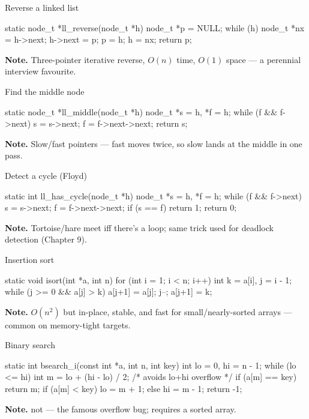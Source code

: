 \begin{gymproblem}{Reverse a linked list}
\begin{cgym}
static node_t *ll_reverse(node_t *h) {
    node_t *p = NULL;
    while (h) { node_t *nx = h->next; h->next = p; p = h; h = nx; }
    return p;
}
\end{cgym}
\textbf{Note.} Three-pointer iterative reverse, $O(n)$ time, $O(1)$ space ---
a perennial interview favourite.
\end{gymproblem}

\begin{gymproblem}{Find the middle node}
\begin{cgym}
static node_t *ll_middle(node_t *h) {
    node_t *s = h, *f = h;
    while (f && f->next) { s = s->next; f = f->next->next; }
    return s;
}
\end{cgym}
\textbf{Note.} Slow/fast pointers --- fast moves twice, so slow lands at the
middle in one pass.
\end{gymproblem}

\begin{gymproblem}{Detect a cycle (Floyd)}
\begin{cgym}
static int ll_has_cycle(node_t *h) {
    node_t *s = h, *f = h;
    while (f && f->next) { s = s->next; f = f->next->next; if (s == f) return 1; }
    return 0;
}
\end{cgym}
\textbf{Note.} Tortoise/hare meet iff there's a loop; same trick used for
deadlock detection (Chapter 9).
\end{gymproblem}

\begin{gymproblem}{Insertion sort}
\begin{cgym}
static void isort(int *a, int n) {
    for (int i = 1; i < n; i++) {
        int k = a[i], j = i - 1;
        while (j >= 0 && a[j] > k) { a[j+1] = a[j]; j--; }
        a[j+1] = k;
    }
}
\end{cgym}
\textbf{Note.} $O(n^2)$ but in-place, stable, and fast for small/nearly-sorted
arrays --- common on memory-tight targets.
\end{gymproblem}

\begin{gymproblem}{Binary search}
\begin{cgym}
static int bsearch_i(const int *a, int n, int key) {
    int lo = 0, hi = n - 1;
    while (lo <= hi) {
        int m = lo + (hi - lo) / 2;     /* avoids lo+hi overflow */
        if (a[m] == key) return m;
        if (a[m] < key) lo = m + 1; else hi = m - 1;
    }
    return -1;
}
\end{cgym}
\textbf{Note.}  not  --- the famous overflow
bug; requires a sorted array.
\end{gymproblem}

